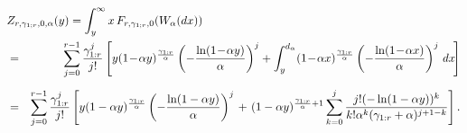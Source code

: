 \documentclass [11pt]{article}
\begin{document}
\begin{eqnarray}
\lefteqn{Z_{r,\gamma_{1;r}, 0,\alpha}(y)=
\int_y^\infty x \,F_{r,\gamma_{1;r},0} (W_\alpha (dx)) }
\nonumber \\ 
& = & \sum_{j=0}^{r-1}
\frac{\gamma_{1:r}^j}{j!}\left[
y(1\!-\!\alpha y)^{\frac{\gamma_{1:r}}{\alpha}} \left( - \frac{\ln (1\!-\!\alpha y)}{\alpha}
\right)^j + \int_y^{d_\alpha}
(1\!-\!\alpha x)^{\frac{\gamma_{1:r}}{\alpha}} \left( - \frac{
\ln (1\!-\!\alpha x)}{\alpha}
\right)^j \,dx\! \right] \nonumber \\[1.25ex]
& = & \sum_{j=0}^{r-1}
\frac{\gamma_{1:r}^j}{j!}\left[
y(1-\alpha y)^{\frac{\gamma_{1:r}}{\alpha}} \left( - \frac{\ln (1-\alpha y)}{\alpha}
\right)^j\right. %
+ \left. (1-\alpha y)^{\frac{\gamma_{1:r}}{\alpha}+1}
\sum_{k=0}^j \frac{j!(-\ln (1-\alpha y))^k}{k!\alpha^k(\gamma_{1:r}+\alpha)^{j+1-k}}
\right]. \nonumber
\label{25e}
\end{eqnarray}
\end{document}
